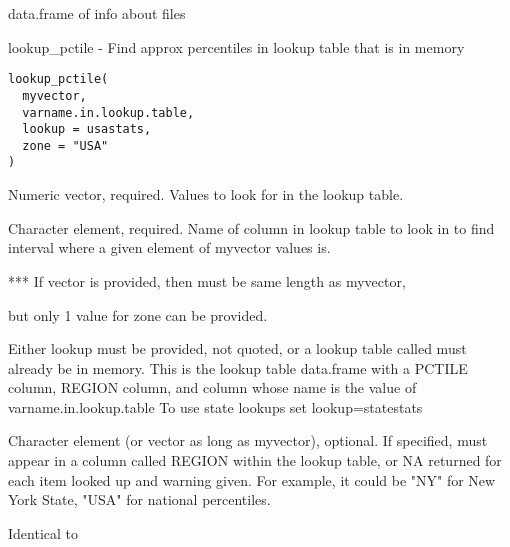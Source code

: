 \documentclass[a4paper]{book}
\begin{document}
%
\begin{Value}
data.frame of info about files
\end{Value}
%
\begin{Description}\relax
lookup\_pctile - Find approx percentiles in lookup table that is in memory
\end{Description}
%
\begin{Usage}
\begin{verbatim}
lookup_pctile(
  myvector,
  varname.in.lookup.table,
  lookup = usastats,
  zone = "USA"
)
\end{verbatim}
\end{Usage}
%
\begin{Arguments}
\begin{ldescription}
\item[\code{myvector}] Numeric vector, required. Values to look for in the lookup table.

\item[\code{varname.in.lookup.table}] Character element, required.
Name of column in lookup table to look in
to find interval where a given element of myvector values is.

*** If vector is provided, then must be same length as myvector,

but only 1 value for zone can be provided.

\item[\code{lookup}] Either lookup must be provided, not quoted,
or a lookup table called  must already be in memory. This is the lookup table
data.frame with a PCTILE column, REGION column, and column whose name is the value of varname.in.lookup.table
To use state lookups set lookup=statestats

\item[\code{zone}] Character element (or vector as long as myvector), optional.
If specified, must appear in a column called REGION within the lookup table,
or NA returned for each item looked up and warning given.
For example, it could be "NY" for New York State, "USA" for national percentiles.
\end{ldescription}
\end{Arguments}
%
\begin{SeeAlso}\relax
Identical to   
\end{SeeAlso}
\end{document}
